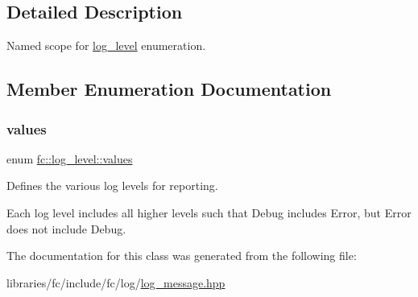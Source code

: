 \subsection{Detailed Description}
Named scope for \mbox{\hyperlink{classfc_1_1log__level}{log\+\_\+level}} enumeration. 

\subsection{Member Enumeration Documentation}
\mbox{\label{classfc_1_1log__level_a5a5e31c4c1f38d9115ecbe44927fb2e4}} 
\subsubsection{\texorpdfstring{values}{values}}
{\footnotesize\ttfamily enum \mbox{\hyperlink{classfc_1_1log__level_a5a5e31c4c1f38d9115ecbe44927fb2e4}{fc\+::log\+\_\+level\+::values}}}



Define\textquotesingle{}s the various log levels for reporting. 

Each log level includes all higher levels such that Debug includes Error, but Error does not include Debug. 

The documentation for this class was generated from the following file\+:\begin{DoxyCompactItemize}
\item 
libraries/fc/include/fc/log/\mbox{\hyperlink{log__message_8hpp}{log\+\_\+message.\+hpp}}\end{DoxyCompactItemize}
